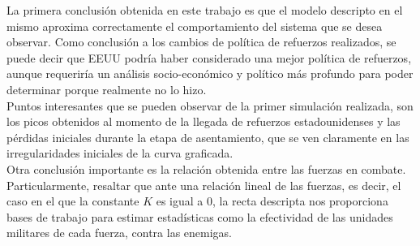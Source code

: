 \documentclass{sig-alternate}
\begin{document}
La primera conclusión obtenida en este trabajo es que el modelo descripto en el mismo aproxima correctamente el comportamiento del sistema 
que se desea observar. Como conclusión a los cambios de política de refuerzos realizados, se puede decir que EEUU podría haber considerado una
mejor política de refuerzos, aunque requeriría un análisis socio-económico y político más profundo para poder determinar porque realmente no
lo hizo.\\
Puntos interesantes que se pueden observar de la primer simulación realizada, son los picos obtenidos al momento de la llegada de refuerzos
estadounidenses y las pérdidas iniciales durante la etapa de asentamiento, que se ven claramente en las irregularidades iniciales de la curva 
graficada.\\
Otra conclusión importante es la relación obtenida entre las fuerzas en combate. Particularmente, resaltar que ante una relación lineal de las
fuerzas, es decir, el caso en el que la constante $K$ es igual a $0$, la recta descripta nos proporciona bases de trabajo para estimar estadísticas
como la efectividad de las unidades militares de cada fuerza, contra las enemigas.
\end{document}
